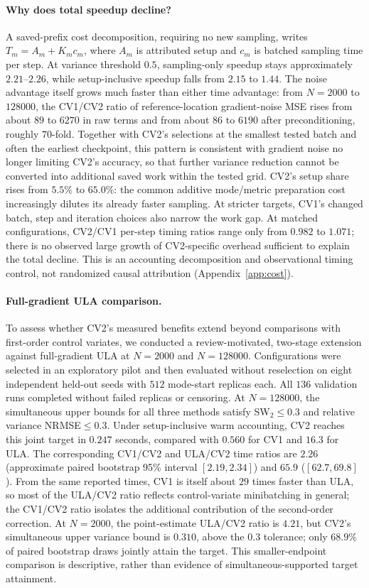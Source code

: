 \paragraph{Why does total speedup decline?}
A saved-prefix cost decomposition, requiring no new sampling, writes $T_m=A_m+K_mc_m$, where $A_m$ is attributed setup and $c_m$ is batched sampling time per step. At variance threshold $0.5$, sampling-only speedup stays approximately $2.21$--$2.26$, while setup-inclusive speedup falls from $2.15$ to $1.44$. The noise advantage itself grows much faster than either time advantage: from $N=2000$ to $128000$, the CV1/CV2 ratio of reference-location gradient-noise MSE rises from about $89$ to $6270$ in raw terms and from about $86$ to $6190$ after preconditioning, roughly $70$-fold. Together with CV2's selections at the smallest tested batch and often the earliest checkpoint, this pattern is consistent with gradient noise no longer limiting CV2's accuracy, so that further variance reduction cannot be converted into additional saved work within the tested grid. CV2's setup share rises from $5.5\%$ to $65.0\%$: the common additive mode/metric preparation cost increasingly dilutes its already faster sampling. At stricter targets, CV1's changed batch, step and iteration choices also narrow the work gap. At matched configurations, CV2/CV1 per-step timing ratios range only from $0.982$ to $1.071$; there is no observed large growth of CV2-specific overhead sufficient to explain the total decline. This is an accounting decomposition and observational timing control, not randomized causal attribution (Appendix~\ref{app:cost}).

\FloatBarrier
\paragraph{Full-gradient ULA comparison.}\label{sec:exp_ula}
To assess whether CV2's measured benefits extend beyond comparisons with first-order control variates, we conducted a review-motivated, two-stage extension against full-gradient ULA at $N=2000$ and $N=128000$. Configurations were selected in an exploratory pilot and then evaluated without reselection on eight independent held-out seeds with $512$ mode-start replicas each. All $136$ validation runs completed without failed replicas or censoring. At $N=128000$, the simultaneous upper bounds for all three methods satisfy SW$_2\leq0.3$ and relative variance NRMSE$\leq0.3$. Under setup-inclusive warm accounting, CV2 reaches this joint target in $0.247$ seconds, compared with $0.560$ for CV1 and $16.3$ for ULA. The corresponding CV1/CV2 and ULA/CV2 time ratios are $2.26$ (approximate paired bootstrap 95\% interval $[2.19,2.34]$) and $65.9$ ($[62.7,69.8]$). From the same reported times, CV1 is itself about $29$ times faster than ULA, so most of the ULA/CV2 ratio reflects control-variate minibatching in general; the CV1/CV2 ratio isolates the additional contribution of the second-order correction. At $N=2000$, the point-estimate ULA/CV2 ratio is $4.21$, but CV2's simultaneous upper variance bound is $0.310$, above the $0.3$ tolerance; only $68.9\%$ of paired bootstrap draws jointly attain the target. This smaller-endpoint comparison is descriptive, rather than evidence of simultaneous-supported target attainment.

